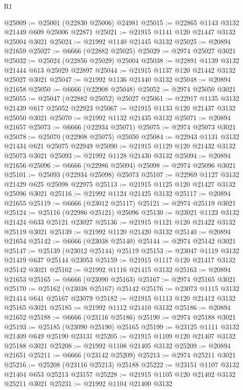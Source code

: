 \begin{lexlean}{R1}
\begin{coremodule}
@25009 := @25001 (@22830 @25006) @24981
@25015 := @22865 @1143 @3132 @21449 @609 @25006 @22871
@25021 := @21915 @1141 @120 @21447 @3132 @25004 @3021
@25024 := @21992 @1140 @21445 @3132
@25025 := @20894 @21659
@25027 := @6666 (@22882 @25025)
@25029 := @2974 @25027 @3021
@25032 := @25024 (@22856 @25029) @25004
@25038 := @22891 @1139 @3132 @21444 @613 @25029 @22897
@25044 := @21915 @1137 @120 @21442 @3132 @25027 @3021
@25047 := @21992 @1136 @21440 @3132
@25048 := @20894 @21658
@25050 := @6666 (@22908 @25048)
@25052 := @2974 @25050 @3021
@25055 := @25047 (@22882 @25052) @25027
@25061 := @22917 @1135 @3132 @21439 @617 @25052 @22923
@25067 := @21915 @1133 @120 @21437 @3132 @25050 @3021
@25070 := @21992 @1132 @21435 @3132
@25071 := @20894 @21657
@25073 := @6666 (@22934 @25071)
@25075 := @2974 @25073 @3021
@25078 := @25070 (@22908 @25075) @25050
@25084 := @22943 @1131 @3132 @21434 @621 @25075 @22949
@25090 := @21915 @1129 @120 @21432 @3132 @25073 @3021
@25093 := @21992 @1128 @21430 @3132
@25094 := @20894 @21656
@25096 := @6666 (@22986 @25094)
@25098 := @2974 @25096 @3021
@25101 := @25093 (@22934 @25098) @25073
@25107 := @22969 @1127 @3132 @21429 @625 @25098 @22975
@25113 := @21915 @1125 @120 @21427 @3132 @25096 @3021
@25116 := @21992 @1124 @21425 @3132
@25117 := @20894 @21655
@25119 := @6666 (@23012 @25117)
@25121 := @2974 @25119 @3021
@25124 := @25116 (@22986 @25121) @25096
@25130 := @23021 @1123 @3132 @21424 @633 @25121 @23027
@25136 := @21915 @1121 @120 @21422 @3132 @25119 @3021
@25139 := @21992 @1120 @21420 @3132
@25140 := @20894 @21654
@25142 := @6666 (@23038 @25140)
@25144 := @2974 @25142 @3021
@25147 := @25139 (@23012 @25144) @25119
@25153 := @23047 @1119 @3132 @21419 @637 @25144 @23053
@25159 := @21915 @1117 @120 @21417 @3132 @25142 @3021
@25162 := @21992 @1116 @21415 @3132
@25163 := @20894 @21653
@25165 := @6666 (@23090 @25163)
@25167 := @2974 @25165 @3021
@25170 := @25162 (@23038 @25167) @25142
@25176 := @23073 @1115 @3132 @21414 @641 @25167 @23079
@25182 := @21915 @1113 @120 @21412 @3132 @25165 @3021
@25185 := @21992 @1112 @21410 @3132
@25186 := @20894 @21652
@25188 := @6666 (@23116 @25186)
@25190 := @2974 @25188 @3021
@25193 := @25185 (@23090 @25190) @25165
@25199 := @23125 @1111 @3132 @21409 @649 @25190 @23131
@25205 := @21915 @1109 @120 @21407 @3132 @25188 @3021
@25208 := @21992 @1108 @21405 @3132
@25209 := @20894 @21651
@25211 := @6666 (@23142 @25209)
@25213 := @2974 @25211 @3021
@25216 := @25208 (@23116 @25213) @25188
@25222 := @23151 @1107 @3132 @21404 @653 @25213 @23157
@25228 := @21915 @1105 @120 @21402 @3132 @25211 @3021
@25231 := @21992 @1104 @21400 @3132

\end{coremodule}
\end{lexlean}
